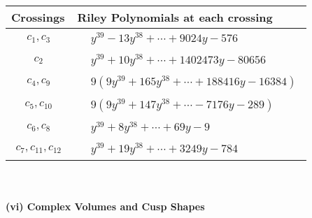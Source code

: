 \documentclass[1p]{elsarticle_modified}
\theoremstyle{definition}
\begin{document}
\begin{tabular}{m{50pt}|m{274pt}}
Crossings & \hspace{64pt}Riley Polynomials at each crossing \\
\hline $$\begin{aligned}c_{1},c_{3}\end{aligned}$$&$\begin{aligned}
&y^{39}-13 y^{38}+\cdots+9024 y-576
\end{aligned}$\\
\hline $$\begin{aligned}c_{2}\end{aligned}$$&$\begin{aligned}
&y^{39}+10 y^{38}+\cdots+1402473 y-80656
\end{aligned}$\\
\hline $$\begin{aligned}c_{4},c_{9}\end{aligned}$$&$\begin{aligned}
&9(9 y^{39}+165 y^{38}+\cdots+188416 y-16384)
\end{aligned}$\\
\hline $$\begin{aligned}c_{5},c_{10}\end{aligned}$$&$\begin{aligned}
&9(9 y^{39}+147 y^{38}+\cdots-7176 y-289)
\end{aligned}$\\
\hline $$\begin{aligned}c_{6},c_{8}\end{aligned}$$&$\begin{aligned}
&y^{39}+8 y^{38}+\cdots+69 y-9
\end{aligned}$\\
\hline $$\begin{aligned}c_{7},c_{11},c_{12}\end{aligned}$$&$\begin{aligned}
&y^{39}+19 y^{38}+\cdots+3249 y-784
\end{aligned}$\\
\hline
\end{tabular}\\~\\
\newpage\flushleft \textbf{(vi) Complex Volumes and Cusp Shapes}
\end{document}
